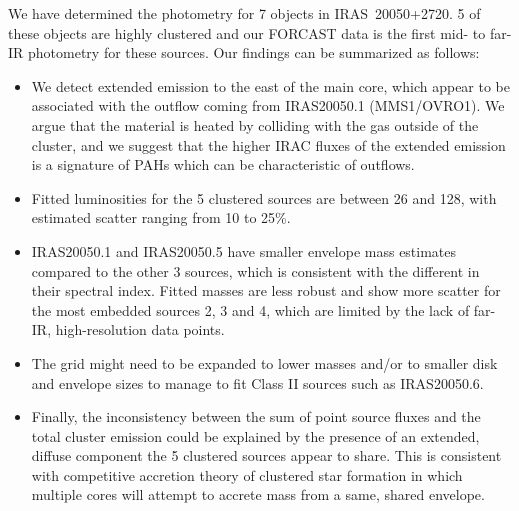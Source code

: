 We have determined the photometry for 7 objects in IRAS~20050+2720. 5 of these objects are highly clustered and our FORCAST data is the first mid- to far-IR photometry for these sources. Our findings can be summarized as follows:
\begin{itemize}
\item We detect extended emission to the east of the main core, which appear to be associated with the outflow coming from IRAS20050.1 (MMS1/OVRO1). We argue that the material is heated by colliding with the gas outside of the cluster, and we suggest that the higher IRAC fluxes of the extended emission is a signature of PAHs which can be characteristic of outflows.
\item Fitted luminosities for the 5 clustered sources are between 26 and \SI{128}{\Lsun}, with estimated scatter ranging from 10 to 25\%. 
\item IRAS20050.1 and IRAS20050.5 have smaller envelope mass estimates compared to the other 3 sources, which is consistent with the different in their spectral index. Fitted masses are less robust and show more scatter for the most embedded sources 2, 3 and 4, which are limited by the lack of far-IR, high-resolution data points.
\item The grid might need to be expanded to lower masses and/or to smaller disk and envelope sizes to manage to fit Class II sources such as IRAS20050.6.
\item Finally, the inconsistency between the sum of point source fluxes and the total cluster emission could be explained by the presence of an extended, diffuse component the 5 clustered sources appear to share. This is consistent with competitive accretion theory of clustered star formation in which multiple cores will attempt to accrete mass from a same, shared envelope.
\end{itemize}



